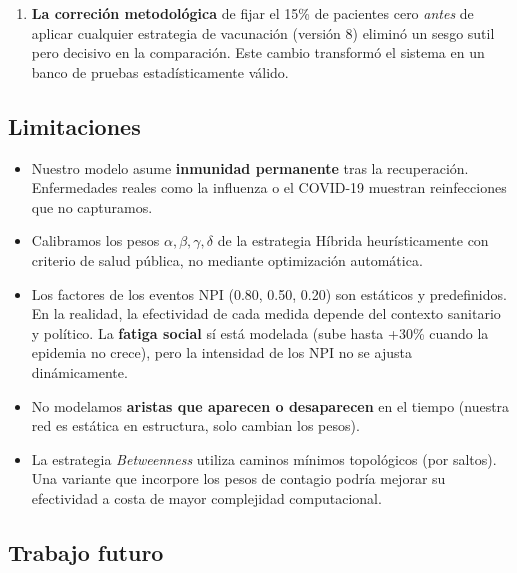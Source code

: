 \documentclass[spanish,notitlepage,letterpaper, 12pt]{article}
\begin{document}
\begin{enumerate}[leftmargin=*]
    \item \textbf{La correci\'on metodol\'ogica} de fijar el 15\% de pacientes cero \emph{antes} de aplicar cualquier estrategia de vacunaci\'on (versi\'on 8) elimin\'o un sesgo sutil pero decisivo en la comparaci\'on. Este cambio transform\'o el sistema en un banco de pruebas estad\'isticamente v\'alido.
\end{enumerate}

\subsection{Limitaciones}

\begin{itemize}[leftmargin=*]
    \item Nuestro modelo asume \textbf{inmunidad permanente} tras la recuperaci\'on. Enfermedades reales como la influenza o el COVID-19 muestran reinfecciones que no capturamos.
    \item Calibramos los pesos $\alpha, \beta, \gamma, \delta$ de la estrategia H\'ibrida heur\'isticamente con criterio de salud p\'ublica, no mediante optimizaci\'on autom\'atica.
    \item Los factores de los eventos NPI (0.80, 0.50, 0.20) son est\'aticos y predefinidos. En la realidad, la efectividad de cada medida depende del contexto sanitario y pol\'itico. La \textbf{fatiga social} s\'i est\'a modelada (sube hasta +30\% cuando la epidemia no crece), pero la intensidad de los NPI no se ajusta din\'amicamente.
    \item No modelamos \textbf{aristas que aparecen o desaparecen} en el tiempo (nuestra red es est\'atica en estructura, solo cambian los pesos).
    \item La estrategia \textit{Betweenness} utiliza caminos m\'inimos topol\'ogicos (por saltos). Una variante que incorpore los pesos de contagio podr\'ia mejorar su efectividad a costa de mayor complejidad computacional.
\end{itemize}

\subsection{Trabajo futuro}
\end{document}
